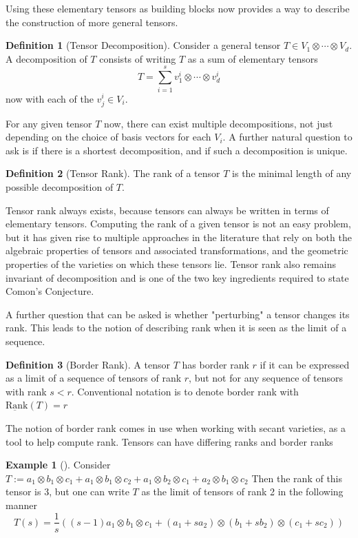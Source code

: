 \documentclass[12pt,a4paper,oneside]{book}
\def\rank{\text{Rank}} %
\theoremstyle{definition}
\newtheorem{definition}{Definition}[section]
\newtheorem{example}{Example}
\begin{document}
Using these elementary tensors as building blocks now provides a way to describe the construction of more general tensors. 
\begin{definition}[Tensor Decomposition]\label{defn:decomposition}
    Consider a general tensor $T \in V_1 \otimes \cdots \otimes V_d$. A decomposition of $T$ consists of writing $T$ as a sum of elementary tensors $$T = \sum_{i=1}^{s} v_1^i \otimes \cdots \otimes v_d^i$$now with each of the $v_j^i \in V_i$. \cite{zhang_comons_2016}
\end{definition}
For any given tensor $T$ now, there can exist multiple decompositions, not just depending on the choice of basis vectors for each $V_i$. A further natural question to ask is if there is a shortest decomposition, and if such a decomposition is unique. 
\begin{definition}[Tensor Rank]\label{defn:tensorrank}
    The rank of a tensor $T$ is the minimal length of any possible decomposition of $T$.
\end{definition}
Tensor rank always exists, because tensors can always be written in terms of elementary tensors. Computing the rank of a given tensor is not an easy problem, but it has given rise to multiple approaches in the literature that rely on both the algebraic properties of tensors and associated transformations, and the geometric properties of the varieties on which these tensors lie. Tensor rank also remains invariant of decomposition and is one of the two key ingredients required to state Comon's Conjecture.

A further question that can be asked is whether "perturbing" a tensor changes its rank. This leads to the notion of describing rank when it is seen as the limit of a sequence. 
\begin{definition}[Border Rank]\label{defn:borderrank}
    A tensor $T$ has border rank $r$ if it can be expressed as a limit of a sequence of tensors of rank $r$, but not for any sequence of tensors with rank $s < r$. Conventional notation is to denote border rank with $\underbar{\rank}(T) = r$
\end{definition}
The notion of border rank comes in use when working with secant varieties, as a tool to help compute rank. Tensors can have differing ranks and border ranks
\begin{example}[\cite{landsberg_tensors_2012}] 
    Consider $T:= a_1 \otimes b_1 \otimes c_1 + a_1 \otimes b_1 \otimes c_2 + a_1 \otimes b_2 \otimes c_1 + a_2 \otimes b_1 \otimes c_2$ Then the rank of this tensor is 3, but one can write $T$ as the limit of tensors of rank 2 in the following manner $$T(s) = \frac{1}{s}\left((s-1)a_1 \otimes b_1 \otimes c_1 + (a_1 + sa_2)\otimes (b_1 + sb_2) \otimes (c_1 + sc_2)\right)$$ 
\end{example} 
\end{document}
